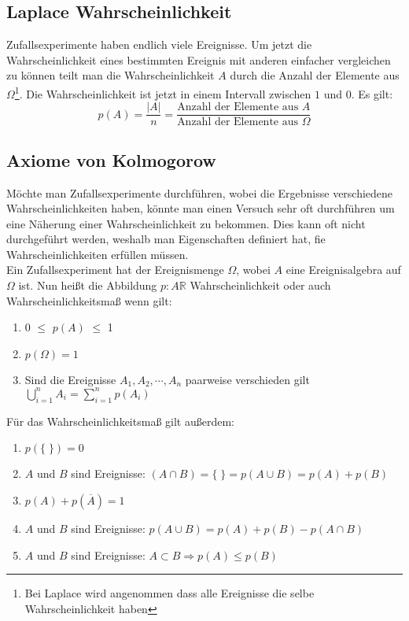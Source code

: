 \documentclass[a4paper]{scrartcl}
\begin{document}
        \subsection{Laplace Wahrscheinlichkeit}
            Zufallsexperimente haben endlich viele Ereignisse. Um jetzt die Wahrscheinlichkeit eines bestimmten Ereignis mit anderen einfacher vergleichen zu können
            teilt man die Wahrscheinlichkeit \(A\) durch die Anzahl der Elemente aus \(\Omega\)\footnote{Bei Laplace wird angenommen dass alle Ereignisse die selbe Wahrscheinlichkeit haben}.
            Die Wahrscheinlichkeit ist jetzt in einem Intervall zwischen \(1\) und \(0\). Es gilt:
            \begin{equation*}
                p(A) = \frac{|A|}{n} = \frac{\text{Anzahl der Elemente aus }A}{\text{Anzahl der Elemente aus } \Omega}
            \end{equation*}
        \subsection{Axiome von Kolmogorow}
            Möchte man Zufallsexperimente durchführen, wobei die Ergebnisse verschiedene Wahrscheinlichkeiten haben, könnte man einen Versuch sehr oft durchführen um eine Näherung 
            einer Wahrscheinlichkeit zu bekommen. Dies kann oft nicht durchgeführt werden, weshalb man Eigenschaften definiert hat, fie Wahrscheinlichkeiten erfüllen müssen. \\
            Ein Zufallsexperiment hat der Ereignismenge \(\Omega\), wobei  \(A\) eine Ereignisalgebra auf \(\Omega\) ist. Nun heißt die Abbildung \(p: A \mathbb{R} \) Wahrscheinlichkeit oder
            auch Wahrscheinlichkeitsmaß wenn gilt:
            \begin{enumerate}
                \item 0 \(\le\) \(p(A)\) \(\le\) 1
                \item \(p(\Omega) = 1\)
                \item Sind die Ereignisse \(A_1,A_2,\cdots,A_n\) paarweise verschieden gilt \(\bigcup\limits_{i=1}^{n} A_i = \sum\limits_{i=1}^n p(A_i) \)
            \end{enumerate} 
            Für das Wahrscheinlichkeitsmaß gilt außerdem: 
            \begin{enumerate}[label=\alph*)]
                \item \(p(\{ \; \}) = 0\)
                \item \(A\) und \(B\) sind Ereignisse: \((A \cap B) = \{ \; \} = p( A \cup B) = p(A) + p(B)\)
                \item \(p(A) + p(\overline{A}) = 1\)
                \item \(A\) und \(B\) sind Ereignisse: \(p(A \cup B) = p(A) + p(B) - p(A \cap B)\)
                \item \(A\) und \(B\) sind Ereignisse: \(A \subset B \Rightarrow p(A) \le p(B)\)
            \end{enumerate}
\end{document}
